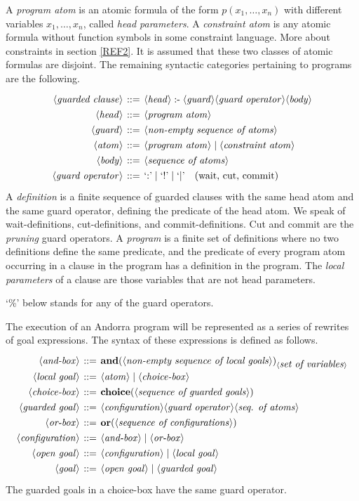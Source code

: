 A {\em program atom} is an atomic formula of the form
$p(x_1,\dots,x_n)$ with different variables $x_1,\dots,x_n$, called
{\em head parameters}. A {\em constraint atom} is any atomic formula
without function symbols in some constraint language. More about
constraints in section \ref{REF2}. It is assumed that these two
classes of atomic formulas are disjoint. The remaining syntactic
categories pertaining to programs are the following.
%
$$\arraycolsep 2pt%
\renewcommand{\arraystretch}{1.3}%
\begin{array}{rcl}
\nt{guarded clause}&\bnf&\nt{head}\pdef\nt{guard}\nt{guard operator}\nt{body}\\
\nt{head}&\bnf&\nt{program atom}\\
\nt{guard}&\bnf&\nt{non-empty sequence of atoms}\\
\nt{atom}&\bnf&\nt{program atom}\mid\nt{constraint atom}\\
\nt{body}&\bnf&\nt{sequence of atoms}\\
\nt{guard operator}&\bnf&\mbox{`$\wait$'}\mid\mbox{`$\cut$'}\mid\mbox{`$\commit$'}\mbox{\quad(wait, cut, commit)}
\end{array}$$%
%
A {\em definition} is a finite sequence of guarded clauses with the
same head atom and the same guard operator, defining the predicate of
the head atom. We speak of wait-definitions, cut-definitions, and
commit-definitions. Cut and commit are the {\em pruning} guard
operators. A {\em program} is a finite set of definitions where no two
definitions define the same predicate, and the predicate of every
program atom occurring in a clause in the program has a definition in
the program. The {\em local parameters} of a clause are those
variables that are not head parameters.

`\%' below stands for any of the guard operators.

The execution of an Andorra program will be represented as a series of
rewrites of goal expressions. The syntax of these expressions is
defined as follows.
%
$$\arraycolsep 2pt%
\renewcommand{\arraystretch}{1.3}%
\begin{array}{rcl}
\nt{and-box}&\bnf&\AND(\nt{non-empty sequence of local goals})_{\nt{set of variables}}\\
\nt{local goal}&\bnf&\nt{atom}\mid\nt{choice-box}\\
\nt{choice-box}&\bnf&\CHOICE(\nt{sequence of guarded goals})\\
\nt{guarded goal}&\bnf&\nt{configuration}\nt{guard operator}\nt{seq. of atoms}\\
\nt{or-box}&\bnf&\OR(\nt{sequence of configurations})\\
\nt{configuration}&\bnf&\nt{and-box} \mid \nt{or-box}\\
\nt{open goal}&\bnf&\nt{configuration}\mid\nt{local goal}\\
\nt{goal}&\bnf&\nt{open goal}\mid\nt{guarded goal}
\end{array}%
$$
%
The guarded goals in a choice-box have the same guard operator.

